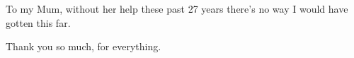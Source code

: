 
\begin{dedication} %

To my Mum, without her help these past 27 years there's no way I would have gotten this far.

Thank you so much, for everything.

\end{dedication}


